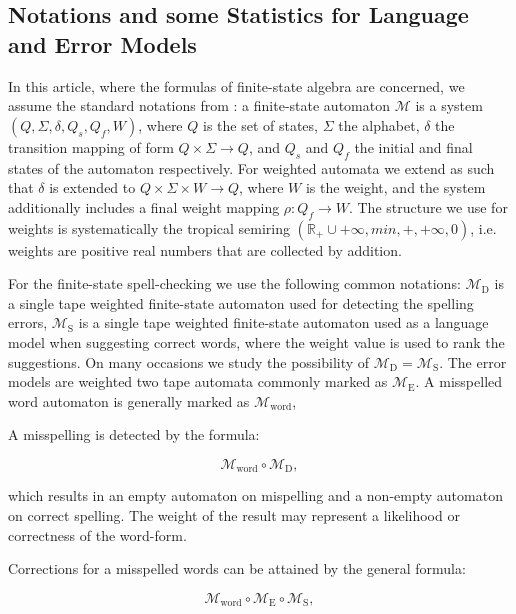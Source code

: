 \documentclass[a4paper,12pt]{article}
\begin{document}
\subsection{Notations and some Statistics for Language and Error Models}
\label{subsec:theory}

In this article, where the formulas of finite-state algebra are concerned, we
assume the standard notations from \cite{aho2007compilers}: a
finite-state automaton $\mathcal{M}$ is a system $(Q, \Sigma, \delta, Q_s, Q_f,
W)$, where $Q$ is the set of states, $\Sigma$ the alphabet, $\delta$ the
transition mapping of form $Q \times \Sigma \rightarrow Q$, and $Q_s$ and $Q_f$
the initial and final states of the automaton respectively. For weighted
automata we extend as \cite{mohri2009weighted} such that $\delta$ is
extended to $Q \times \Sigma \times W \rightarrow Q$, where $W$ is the
weight, and the system additionally includes a final weight mapping $\rho: Q_f
\rightarrow W$. The structure we use for weights is systematically the tropical
semiring $(\mathbb{R}_+ \cup {+\infty}, min, +, +\infty, 0)$, i.e. weights are
positive real numbers that are collected by addition.

For the finite-state spell-checking we use the following common notations:
$\mathcal{M}_\mathrm{D}$ is a single tape weighted finite-state automaton used
for detecting the spelling errors, $\mathcal{M}_\mathrm{S}$ is a single tape
weighted finite-state automaton used as a language model when suggesting
correct words, where the weight value is used to rank the suggestions. On many
occasions we study the possibility of $\mathcal{M}_\mathrm{D} =
\mathcal{M}_\mathrm{S}$. The error models are weighted two tape automata
commonly marked as $\mathcal{M}_\mathrm{E}$. A misspelled word automaton is
generally marked as $\mathcal{M}_\mathrm{word}$,

A misspelling is detected by the formula:

\begin{equation}
    \label{formula:detection}
    \mathcal{M}_{\mathrm{word}} \circ \mathcal{M}_\mathrm{D},
\end{equation}

which results in an empty automaton on mispelling and a non-empty automaton on
correct spelling. The weight of the result may represent a likelihood or
correctness of the word-form.

Corrections for a misspelled words can be attained by the general formula:

\begin{equation}
    \label{formula:correction}
    \mathcal{M}_{\mathrm{word}} \circ \mathcal{M}_{\mathrm{E}} \circ \mathcal{M}_{\mathrm{S}},
\end{equation}
\end{document}
